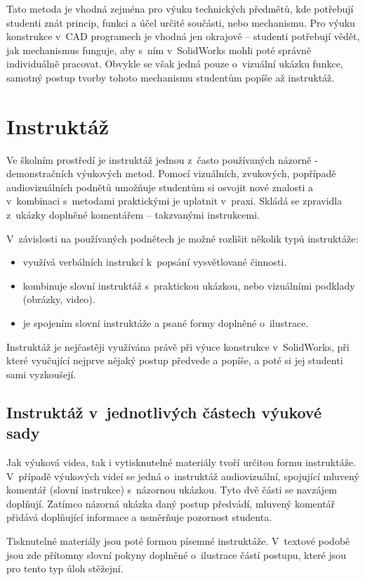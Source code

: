 Tato metoda je vhodná zejména pro výuku technických předmětů, kde potřebují studenti znát princip, funkci a účel určité součásti, nebo mechanismu. 
Pro výuku konstrukce v~CAD programech je vhodná jen okrajově -- studenti potřebují vědět, jak mechanismus funguje, aby s~ním v~SolidWorks mohli poté správně individuálně pracovat.
Obvykle se však jedná pouze o~vizuální ukázku funkce, samotný postup tvorby tohoto mechanismu studentům popíše až instruktáž.

\section{Instruktáž}
Ve školním prostředí je instruktáž jednou z~často používaných názorně - demonstračních výukových metod.
Pomocí vizuálních, zvukových, popřípadě audiovizuálních podnětů umožňuje studentům si osvojit nové znalosti a v~kombinaci s~metodami praktickými je uplatnit v~praxi.
Skládá se zpravidla z~ukázky doplněné komentářem -- takzvanými instrukcemi.

\noindent V~závislosti na používaných podnětech je možné rozlišit několik typů instruktáže:
\begin{itemize}[topsep=0pt]
    \setlength\itemsep{0em}
    \item {} využívá verbálních instrukcí k~popsání vysvětlované činnosti.
    \item {} kombinuje slovní instruktáž s~praktickou ukázkou, nebo vizuálními podklady (obrázky, video).
    \item {} je spojením slovní instruktáže a psané formy doplněné o~ilustrace.
\end{itemize}

Instruktáž je nejčastěji využívána právě při výuce konstrukce v~SolidWorks, při které vyučující nejprve nějaký postup předvede a popíše, a poté si jej studenti sami vyzkoušejí.

\subsection{Instruktáž v~jednotlivých částech výukové sady}
Jak výuková videa, tak i vytisknutelné materiály tvoří určitou formu instruktáže.
V~případě výukových videí se jedná o~instruktáž audiovizuální, spojující mluvený komentář (slovní instrukce) s~názornou ukázkou.
Tyto dvě části se navzájem doplňují.
Zatímco názorná ukázka daný postup předvádí, mluvený komentář přidává doplňující informace a usměrňuje pozornost studenta.

Tisknutelné materiály jsou poté formou písemné instruktáže.
V~textové podobě jsou zde přítomny slovní pokyny doplněné o~ilustrace částí postupu, které jsou pro tento typ úloh stěžejní.

\newpage